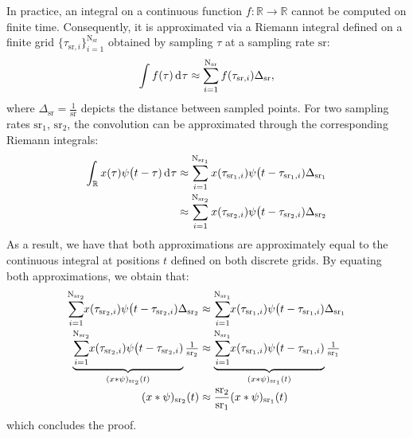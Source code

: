 \documentclass{article}
\def\sR{{\mathbb{R}}}
\def\Nt{\mathrm{N}}
\def\sR{{\mathbb{R}}}
\newcommand{\du}{\mathrm{d}\mkern1mu}
\begin{document}
In practice, an integral on a continuous function $f: \sR \rightarrow \sR$ cannot be computed on finite time. Consequently, it is approximated via a Riemann integral defined on a finite grid $\{ \tau_{\mathrm{sr}, i} \}_{i = 1}^{\Nt_\mathrm{sr}}$ obtained by sampling $\tau$ at a sampling rate $\mathrm{sr}$:
\begin{equation*}
\setlength{\abovedisplayskip}{1pt}
\setlength{\belowdisplayskip}{1pt}
    \int f(\tau) \, \du \tau \approx \sum_{i = 1}^{\Nt_\mathrm{sr}} f(\tau_{\mathrm{sr}, i}) \Delta_{\mathrm{sr}},
\end{equation*}
where $\Delta_{\mathrm{sr}} = \tfrac{1}{\mathrm{sr}}$ depicts the distance between sampled points. For two sampling rates $\mathrm{sr}_1$, $\mathrm{sr}_2$, the convolution can be approximated through the corresponding Riemann integrals:
\begin{align}
\setlength{\abovedisplayskip}{0pt}
\setlength{\belowdisplayskip}{0pt}
   \int_{\sR} x(\tau) \psi\big(t - \tau) \,  \du \tau  & \approx \sum_{i = 1}^{\Nt_{\mathrm{sr}_{1}}} x(\tau_{\mathrm{sr}_{1}, i}) \psi\big(t - \tau_{\mathrm{sr}_{1}, i}) \Delta_{\mathrm{sr}_{1}}  \nonumber \\[-0.5\jot]
    & \approx \sum_{i = 1}^{\Nt_{\mathrm{sr}_{2}}} x(\tau_{\mathrm{sr}_{2}, i}) \psi\big(t - \tau_{\mathrm{sr}_{2}, i}) \Delta_{\mathrm{sr}_{2}}  \nonumber 
\end{align}
As a result, we have that both approximations are approximately equal to the continuous integral at positions $t$ defined on both discrete grids. By equating both approximations, we obtain that: 
\begin{align}
\setlength{\abovedisplayskip}{0pt}
\setlength{\belowdisplayskip}{0pt}
    \sum_{i = 1}^{\Nt_{\mathrm{sr_2}}} \hspace{-1mm} x(\tau_{\mathrm{sr_2}, i}) \psi\big(t - \tau_{\mathrm{sr_2}, i}) \Delta_{\mathrm{sr_2}} & \approx  \sum_{i = 1}^{\Nt_{\mathrm{sr_1}}} \hspace{-1mm} x(\tau_{\mathrm{sr_1}, i}) \psi\big(t - \tau_{\mathrm{sr_1}, i})  \Delta_{\mathrm{sr_1}} \nonumber \\[-0.5\jot]
    \underbrace{\sum_{i = 1}^{\Nt_{\mathrm{sr_2}}} \hspace{-1mm} x(\tau_{\mathrm{sr_2}, i}) \psi\big(t - \tau_{\mathrm{sr_2}, i})}_{(x * \psi)_{\mathrm{sr_2}}(t)} \tfrac{1}{\mathrm{sr_2}} & \approx \underbrace{\sum_{i = 1}^{\Nt_{\mathrm{sr}_{1}}} \hspace{-1mm} x(\tau_{\mathrm{sr_1}, i}) \psi\big(t - \tau_{\mathrm{sr_1}, i})}_{(x * \psi)_{\mathrm{sr_1}}(t)} \tfrac{1}{\mathrm{sr_1}} \nonumber \\[-0.5\jot]
    (x *\psi)_\mathrm{sr_2}(t) &\approx \frac{\mathrm{sr_2}}{\mathrm{sr_1}}(x *\psi)_\mathrm{sr_1}(t)  \nonumber
\end{align}
which concludes the proof. 
\vspace{-1mm}
\end{document}
